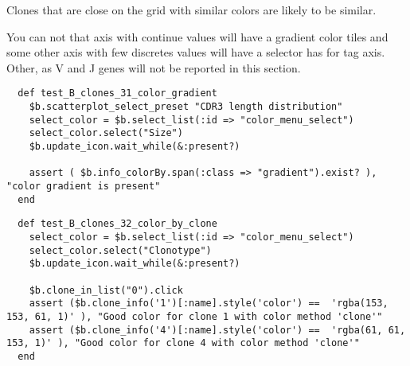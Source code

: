 Clones that are close on the grid with similar colors are likely to
be similar.

You can not that axis with continue values will have a gradient color tiles and some other axis with few discretes values will have a selector has for tag axis. Other, as V and J genes will not be reported in this section.
\begin{verbatim}
  def test_B_clones_31_color_gradient
    $b.scatterplot_select_preset "CDR3 length distribution"
    select_color = $b.select_list(:id => "color_menu_select")
    select_color.select("Size")
    $b.update_icon.wait_while(&:present?)

    assert ( $b.info_colorBy.span(:class => "gradient").exist? ), "color gradient is present"
  end
\end{verbatim}

\begin{verbatim}
  def test_B_clones_32_color_by_clone
    select_color = $b.select_list(:id => "color_menu_select")
    select_color.select("Clonotype")
    $b.update_icon.wait_while(&:present?)

    $b.clone_in_list("0").click
    assert ($b.clone_info('1')[:name].style('color') ==  'rgba(153, 153, 61, 1)' ), "Good color for clone 1 with color method 'clone'"
    assert ($b.clone_info('4')[:name].style('color') ==  'rgba(61, 61, 153, 1)' ), "Good color for clone 4 with color method 'clone'"
  end
\end{verbatim}



